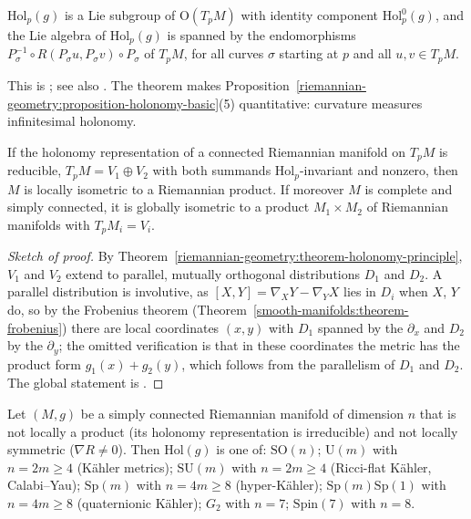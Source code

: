 \begin{theorem}\label{riemannian-geometry:theorem-ambrose-singer}
$\mathrm{Hol}_p(g)$ is a Lie subgroup of $\mathrm{O}(T_pM)$ with identity component $\mathrm{Hol}^0_p(g)$, and the Lie algebra of $\mathrm{Hol}_p(g)$ is spanned by the endomorphisms $P_\sigma^{-1} \circ R(P_\sigma u, P_\sigma v) \circ P_\sigma$ of
$T_pM$, for all curves $\sigma$ starting at $p$ and all $u, v \in T_pM$.
\end{theorem}

This is \cite[Chapter II]{kobayashi-nomizu}; see also \cite{joyce-special-holonomy}. The theorem makes Proposition~\ref{riemannian-geometry:proposition-holonomy-basic}(5) quantitative: curvature measures infinitesimal holonomy.

\begin{theorem}\label{riemannian-geometry:theorem-de-rham-decomposition}
If the holonomy representation of a connected Riemannian manifold on $T_pM$ is reducible, $T_pM = V_1 \oplus V_2$ with both summands $\mathrm{Hol}_p$-invariant and nonzero, then $M$ is locally isometric to a Riemannian product.
If moreover $M$ is complete and simply connected, it is globally isometric to a product $M_1 \times M_2$ of Riemannian manifolds with $T_pM_i = V_i$.
\end{theorem}

\begin{proof}[Sketch of proof]
By Theorem~\ref{riemannian-geometry:theorem-holonomy-principle}, $V_1$ and $V_2$ extend to parallel, mutually orthogonal distributions $D_1$ and $D_2$. A parallel distribution is involutive, as $[X, Y] = \nabla_XY - \nabla_YX$ lies in
$D_i$ when $X$, $Y$ do, so by the Frobenius theorem (Theorem~\ref{smooth-manifolds:theorem-frobenius}) there are local coordinates $(x, y)$ with $D_1$ spanned by the $\partial_x$ and $D_2$ by the $\partial_y$; the omitted verification is that in
these coordinates the metric has the product form $g_1(x) + g_2(y)$, which follows from the parallelism of $D_1$ and $D_2$. The global statement is \cite[Chapter IV]{kobayashi-nomizu}.
\end{proof}

\begin{theorem}[Berger]\label{riemannian-geometry:theorem-berger}
Let $(M, g)$ be a simply connected Riemannian manifold of dimension $n$ that is not locally a product (its holonomy representation is irreducible) and not locally symmetric ($\nabla R \neq 0$). Then $\mathrm{Hol}(g)$ is one
of: $\mathrm{SO}(n)$; $\mathrm{U}(m)$ with $n = 2m \geq 4$ (K\"ahler metrics); $\mathrm{SU}(m)$ with $n = 2m \geq 4$ (Ricci-flat K\"ahler, Calabi--Yau); $\mathrm{Sp}(m)$ with $n = 4m \geq 8$ (hyper-K\"ahler); $\mathrm{Sp}(m)\mathrm{Sp}(1)$ with
$n = 4m \geq 8$ (quaternionic K\"ahler); $G_2$ with $n = 7$; $\mathrm{Spin}(7)$ with $n = 8$.
\end{theorem}

